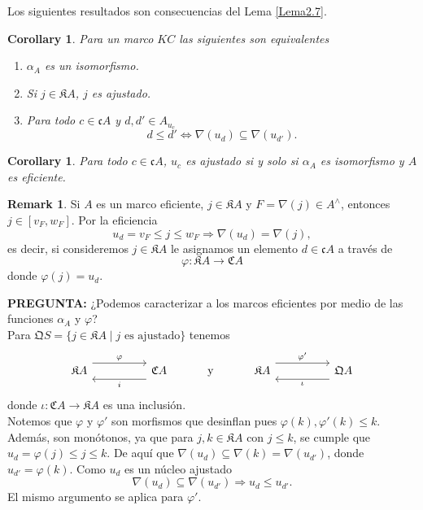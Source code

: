 \documentclass[11pt]{amsart}
\theoremstyle{plain}
\newtheorem{cor}[thm]{Corollary}
\theoremstyle{definition}
\newtheorem{obs}[thm]{Remark}
\begin{document}
Los siguientes resultados son consecuencias del Lema \ref{Lema2.7}.

\begin{cor}
        Para un marco $KC$ las siguientes son equivalentes
    \begin{enumerate}
        \item $\alpha_A$ es un isomorfismo.
        \item Si $j\in \mathfrak{K}A$, $j$ es ajustado.
        \item Para todo $c\in \mathfrak{c}A$ y $d, d'\in A_{u_c}$
        \begin{equation}\label{saju}
            d\leq d'\Leftrightarrow \nabla(u_d)\subseteq \nabla(u_{d'}).
        \end{equation}
    \end{enumerate}
\end{cor}

\begin{cor}
    Para todo $c\in \mathfrak{c}A$, $u_c$ es ajustado si y solo si $\alpha_A$ es isomorfismo y $A$ es eficiente.
\end{cor}

\begin{obs}
Si $A$ es un marco eficiente, $j\in \mathfrak{K}A$ y $F=\nabla(j)\in A^\wedge$, entonces $j\in [v_F, w_F]$. Por la eficiencia  
\[
u_d=v_F\leq j\leq w_F\Rightarrow \nabla(u_d)=\nabla(j),
\]
es decir, si consideremos $j\in \mathfrak{K}A$ le asignamos un elemento $d\in \mathfrak{c}A$ a través de
\[
\varphi\colon\mathfrak{K}A\to \mathfrak{C}A
\]
donde $\varphi(j)=u_d$.

\end{obs}

\textbf{PREGUNTA:} ¿Podemos caracterizar a los marcos eficientes por medio de las funciones $\alpha_A$ y $\varphi$?\\

Para $\mathfrak{Q}S=\{j\in \mathfrak{K}A\mid j \mbox{ es ajustado}\}$ tenemos 
\[\begin{tikzcd}
	{\mathfrak{K}A} && {\mathfrak{C}A} & {\mbox{ y }} & {\mathfrak{K}A} && {\mathfrak{Q}A}
	\arrow["\varphi", shift left=3, from=1-1, to=1-3]
	\arrow["i", shift left=3, from=1-3, to=1-1]
	\arrow["{\varphi'}", shift left=3, from=1-5, to=1-7]
	\arrow["\iota", shift left=3, from=1-7, to=1-5]
\end{tikzcd}\]
donde $\iota\colon \mathfrak{C}A\to \mathfrak{K}A$ es una inclusión.\\

Notemos que $\varphi$ y $\varphi'$ son morfismos que desinflan pues $\varphi(k),\varphi'(k)\leq k$. Además, son monótonos, ya que para $j, k\in \mathfrak{K}A$ con $j\leq k$, se cumple que $u_d=\varphi(j)\leq j\leq k$. De aquí que $\nabla(u_d)\subseteq\nabla(k)=\nabla(u_{d'})$, donde $u_{d'}=\varphi(k)$. Como $u_d$ es un núcleo ajustado
\[
\nabla(u_d)\subseteq \nabla(u_{d'})\Rightarrow u_d\leq u_{d'}.
\]
El mismo argumento se aplica para $\varphi'$.\\
\end{document}
